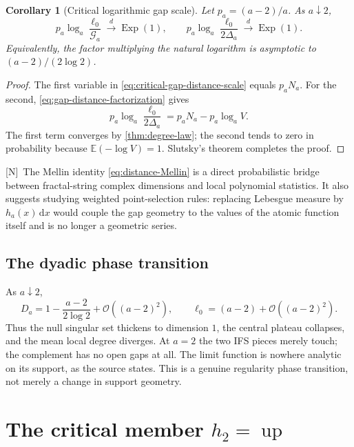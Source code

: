 \documentclass[11pt,oneside]{article}
\newtheorem{corollary}[theorem]{Corollary}
\theoremstyle{definition}
\theoremstyle{remark}
\newcommand{\Up}{\operatorname{up}}
\newcommand{\dd}{\,\mathrm d}
\newcommand{\E}{\mathbb E}
\newcommand{\bigO}{\mathcal O}
\newcommand{\Nmark}{\textcolor{newgreen}{\textsf{[N]}}}
\begin{document}
\begin{corollary}[Critical logarithmic gap scale]
\label{cor:critical-gap-scale}
Let $p_a=(a-2)/a$.  As $a\downarrow2$,
\begin{equation}
 p_a\log_a\frac{\ell_0}{\mathcal G_a}
 \xrightarrow{\ d\ }\operatorname{Exp}(1),
 \qquad
 p_a\log_a\frac{\ell_0}{2\Delta_a}
 \xrightarrow{\ d\ }\operatorname{Exp}(1).
 \label{eq:critical-gap-distance-scale}
\end{equation}
Equivalently, the factor multiplying the natural logarithm is asymptotic to
$(a-2)/(2\log2)$.
\end{corollary}

\begin{proof}
The first variable in \eqref{eq:critical-gap-distance-scale} equals $p_aN_a$.  For the second,
\eqref{eq:gap-distance-factorization} gives
\[
 p_a\log_a\frac{\ell_0}{2\Delta_a}
 =p_aN_a-p_a\log_aV.
\]
The first term converges by \cref{thm:degree-law}; the second tends to zero in probability
because $\E(-\log V)=1$.  Slutsky's theorem completes the proof.
\end{proof}

\Nmark\ The Mellin identity \eqref{eq:distance-Mellin} is a direct probabilistic bridge between
fractal-string complex dimensions and local polynomial statistics.  It also suggests studying
weighted point-selection rules: replacing Lebesgue measure by $h_a(x)\dd x$ would couple the
gap geometry to the values of the atomic function itself and is no longer a geometric series.

\subsection{The dyadic phase transition}

As $a\downarrow2$,
\begin{equation}
 D_a=1-\frac{a-2}{2\log2}+\bigO((a-2)^2),
 \qquad
 \ell_0=(a-2)+\bigO((a-2)^2).
 \label{eq:critical-expansions}
\end{equation}
Thus the null singular set thickens to dimension $1$, the central plateau collapses, and the
mean local degree diverges.  At $a=2$ the two IFS pieces merely touch; the complement has no
open gaps at all.  The limit function is nowhere analytic on its support, as the source states.
This is a genuine regularity phase transition, not merely a change in support geometry.

\section{The critical member $h_2=\Up$}
\label{sec:up}
\end{document}
